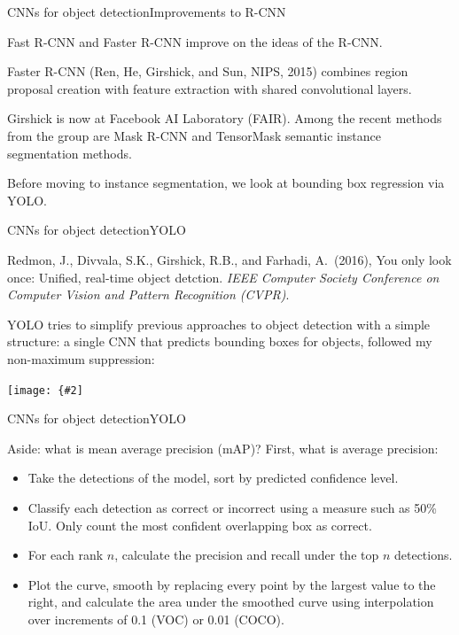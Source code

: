 \documentclass[aspectratio=169]{beamer}
\newcommand{\myfig}[3]{\centerline{\texttt{[image: \{\#2]}}}
\begin{document}
\begin{frame}{CNNs for object detection}{Improvements to R-CNN}

  Fast R-CNN and Faster R-CNN improve on the ideas of the R-CNN.

  \medskip

  Faster R-CNN (Ren, He, Girshick, and Sun, NIPS, 2015) combines
  region proposal creation with feature extraction with shared
  convolutional layers.

  \medskip

  Girshick is now at Facebook AI Laboratory (FAIR).  Among the recent
  methods from the group are \alert{Mask R-CNN} and \alert{TensorMask}
  semantic instance segmentation methods.

  \medskip

  Before moving to instance segmentation, we look at bounding box
  regression via YOLO.

\end{frame}


\begin{frame}{CNNs for object detection}{YOLO}

  Redmon, J., Divvala, S.K., Girshick, R.B., and Farhadi, A.\ (2016),
  You only look once: Unified, real-time object detction. \textit{IEEE
    Computer Society Conference on Computer Vision and Pattern
    Recognition (CVPR)}.

  \medskip

  YOLO tries to simplify previous approaches to object detection with
  a simple structure: a single CNN that predicts bounding boxes for
  objects, followed my non-maximum suppression:

  \bigskip
  
  \myfig{4in}{redmon-fig1}{Redmon et al.\ (2016), Fig.\ 1}

\end{frame}


\begin{frame}{CNNs for object detection}{YOLO}

  Aside: what is \alert{mean average precision (mAP)}? First, what is
  average precision:
  \begin{itemize}
  \item Take the detections of the model, sort by predicted confidence
    level.
  \item Classify each detection as correct or incorrect using a
    measure such as 50\% IoU. Only count the most confident
    overlapping box as correct.
  \item For each rank $n$, calculate the precision and recall under
    the top $n$ detections.
  \item Plot the curve, smooth by replacing every point by the largest
    value to the right, and calculate the area under the smoothed
    curve using interpolation over increments of 0.1 (VOC) or 0.01
    (COCO).
  \end{itemize}

\end{frame}
\end{document}
